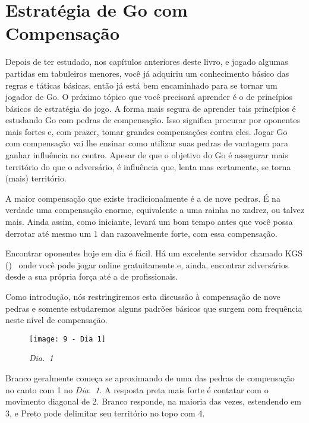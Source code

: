 \chapter{Estratégia de Go com Compensação}\label{chap:estrat_comp}

Depois de ter estudado, nos capítulos anteriores deste livro, e jogado algumas partidas em tabuleiros menores, você já adquiriu um conhecimento básico das regras e táticas básicas, então já está bem encaminhado para se tornar um jogador de Go. O próximo tópico que você precisará aprender é o de princípios básicos de estratégia do jogo. A forma mais segura de aprender tais princípios é estudando Go com pedras de compensação. Isso significa procurar por oponentes mais fortes e, com prazer, tomar grandes compensações contra eles. Jogar Go com compensação vai lhe ensinar como utilizar suas pedras de vantagem para ganhar influência no centro. Apesar de que o objetivo do Go é assegurar mais território do que o adversário, é influência que, lenta mas certamente, se torna (mais) território.

A maior compensação que existe tradicionalmente é a de nove pedras. É na verdade uma compensação enorme, equivalente a uma rainha no xadrez, ou talvez mais. Ainda assim, como iniciante, levará um bom tempo antes que você possa derrotar até mesmo um 1 dan razoavelmente forte, com essa compensação.

Encontrar oponentes hoje em dia é fácil. Há um excelente servidor chamado KGS (\href{https://www.gokgs.com}{})~\cite{kgs} onde você pode jogar online gratuitamente e, ainda, encontrar adversários desde a sua própria força até a de profissionais.

Como introdução, nós restringiremos esta discussão à compensação de nove pedras e somente estudaremos alguns padrões básicos que surgem com frequência neste nível de compensação.

\pagebreak

\begin{wrapfigure}{r}{60mm}
    \vspace{-15pt}
    \begin{center}
        \texttt{[image: 9 - Dia 1]}
        \captionsetup{justification=centering}
        \caption*{\emph{Dia.\@~1}}
    \end{center}
    \vspace{-20pt}
\end{wrapfigure}

Branco geralmente começa se aproximando de uma das pedras de compensação no canto com 1 no \emph{Dia.\@~1}. A resposta preta mais forte é contatar com o movimento diagonal de 2. Branco responde, na maioria das vezes, estendendo em 3, e Preto pode delimitar seu território no topo com 4.

